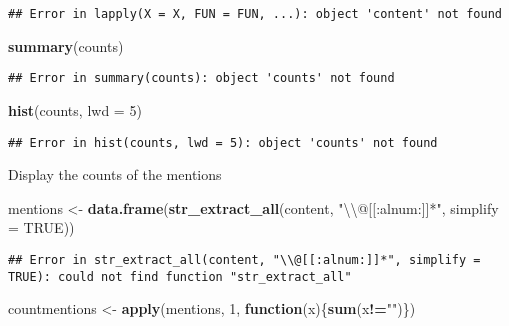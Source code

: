 \documentclass[]{article}
\newenvironment{Shaded}{\begin{snugshade}}{\end{snugshade}}
\newcommand{\KeywordTok}[1]{\textcolor[rgb]{0.13,0.29,0.53}{\textbf{#1}}}
\newcommand{\DataTypeTok}[1]{\textcolor[rgb]{0.13,0.29,0.53}{#1}}
\newcommand{\DecValTok}[1]{\textcolor[rgb]{0.00,0.00,0.81}{#1}}
\newcommand{\CharTok}[1]{\textcolor[rgb]{0.31,0.60,0.02}{#1}}
\newcommand{\StringTok}[1]{\textcolor[rgb]{0.31,0.60,0.02}{#1}}
\newcommand{\OtherTok}[1]{\textcolor[rgb]{0.56,0.35,0.01}{#1}}
\newcommand{\ControlFlowTok}[1]{\textcolor[rgb]{0.13,0.29,0.53}{\textbf{#1}}}
\newcommand{\OperatorTok}[1]{\textcolor[rgb]{0.81,0.36,0.00}{\textbf{#1}}}
\newcommand{\NormalTok}[1]{#1}
\begin{document}
\begin{verbatim}
## Error in lapply(X = X, FUN = FUN, ...): object 'content' not found
\end{verbatim}

\begin{Shaded}
\begin{Highlighting}[]
\KeywordTok{summary}\NormalTok{(counts)}
\end{Highlighting}
\end{Shaded}

\begin{verbatim}
## Error in summary(counts): object 'counts' not found
\end{verbatim}

\begin{Shaded}
\begin{Highlighting}[]
\KeywordTok{hist}\NormalTok{(counts, }\DataTypeTok{lwd =} \DecValTok{5}\NormalTok{)}
\end{Highlighting}
\end{Shaded}

\begin{verbatim}
## Error in hist(counts, lwd = 5): object 'counts' not found
\end{verbatim}

Display the counts of the mentions

\begin{Shaded}
\begin{Highlighting}[]
\NormalTok{mentions <-}\StringTok{ }\KeywordTok{data.frame}\NormalTok{(}\KeywordTok{str_extract_all}\NormalTok{(content, }\StringTok{"}\CharTok{\textbackslash{}\textbackslash{}}\StringTok{@[[:alnum:]]*"}\NormalTok{, }\DataTypeTok{simplify =} \OtherTok{TRUE}\NormalTok{))}
\end{Highlighting}
\end{Shaded}

\begin{verbatim}
## Error in str_extract_all(content, "\\@[[:alnum:]]*", simplify = TRUE): could not find function "str_extract_all"
\end{verbatim}

\begin{Shaded}
\begin{Highlighting}[]
\NormalTok{countmentions <-}\StringTok{ }\KeywordTok{apply}\NormalTok{(mentions, }\DecValTok{1}\NormalTok{, }\ControlFlowTok{function}\NormalTok{(x)\{}\KeywordTok{sum}\NormalTok{(x}\OperatorTok{!=}\StringTok{""}\NormalTok{)\})}
\end{Highlighting}
\end{Shaded}
\end{document}
